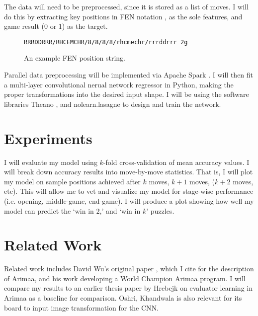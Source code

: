 \documentclass{article}
\begin{document}
The data will need to be preprocessed, since it is stored as a list of moves.  I will do this by extracting key positions in FEN notation \cite{fen}, as the sole features, and game result (0 or 1) as the target.

\begin{figure}[h]
\begin{center}
\texttt{RRRDDRRR/RHCEMCHR/8/8/8/8/rhcmechr/rrrddrrr 2g}
\end{center}
\caption{An example FEN position string.}
\end{figure}

Parallel data preprocessing will be implemented via Apache Spark \cite{spark}.  I will then fit a multi-layer convolutional nerual network regressor in Python, making the proper transformations into the desired input shape.  I will be using the software libraries Theano \cite{theano}, and nolearn.lasagne \cite{nolearn_lasagne} to design and train the network.

\section{Experiments}

I will evaluate my model using $k$-fold cross-validation of mean accuracy values.  I will break down accuracy results  into move-by-move statistics.  That is, I will plot my model on sample positions achieved after $k$ moves, $k+1$ moves, ($k+2$ moves, etc).  This will allow me to vet and visualize my model for stage-wise performance (i.e. opening, middle-game, end-game).  I will produce a plot showing how well my model can predict the `win in $2$,' and `win in $k$' puzzles.

\section{Related Work}

Related work includes David Wu's original paper \cite{wu}, which I cite for the description of Arimaa, and his work developing a World Champion Arimaa program.  I will compare my results to an earlier thesis paper by Hrebejk \cite{Hrebejk} on evaluator learning in Arimaa as a baseline for comparison.  Oshri, Khandwala \cite{Oshri_Khandwala} is also relevant for its board to input image transformation for the CNN.
\end{document}
